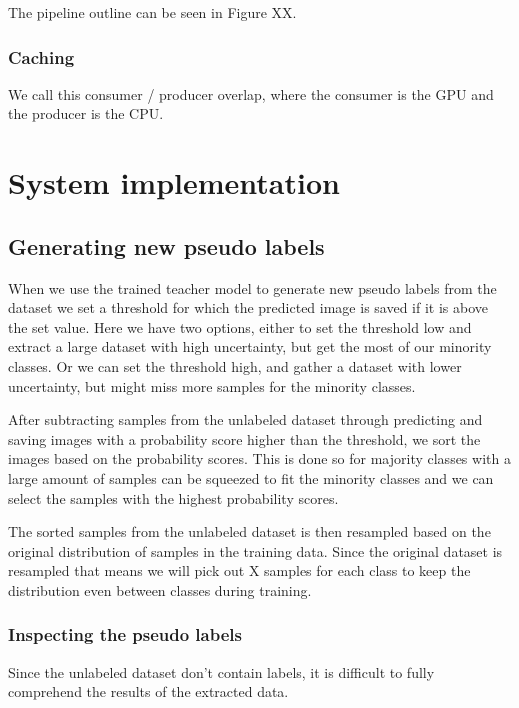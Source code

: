 \documentclass[thesis.tex]{subfiles}
\begin{document}
The pipeline outline can be seen in Figure XX.

\subsubsection{Caching}
We call this consumer / producer overlap, where the consumer is the GPU and the producer is the CPU. %




\section{System implementation} \label{sec:system_implementation}


\subsection{Generating new pseudo labels}
When we use the trained teacher model to generate new pseudo labels from the dataset we set a threshold for which the predicted image is saved if it is above the set value. Here we have two options, either to set the threshold low and extract a large dataset with high uncertainty, but get the most of our minority classes. Or we can set the threshold high, and gather a dataset with lower uncertainty, but might miss more samples for the minority classes.

After subtracting samples from the unlabeled dataset through predicting and saving images with a probability score higher than the threshold, we sort the images based on the probability scores. This is done so for majority classes with a large amount of samples can be squeezed to fit the minority classes and we can select the samples with the highest probability scores.

The sorted samples from the unlabeled dataset is then resampled based on the original distribution of samples in the training data. Since the original dataset is resampled that means we will pick out X samples for each class to keep the distribution even between classes during training.

\subsubsection{Inspecting the pseudo labels}
Since the unlabeled dataset don't contain labels, it is difficult to fully comprehend the results of the extracted data.
\end{document}

